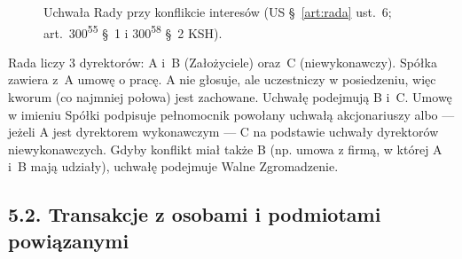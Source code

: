 \documentclass[11pt,a4paper]{report}
\newcommand{\US}[1]{US §~#1}
\begin{document}
\begin{figure}[H]
\centering
{}
\caption{Uchwała Rady przy konflikcie interesów (\US{\ref{art:rada} ust.~6}; art.~300\textsuperscript{55} §~1 i 300\textsuperscript{58} §~2 KSH).}
\end{figure}

\begin{Przyklad}
Rada liczy 3 dyrektorów: A i~B (Założyciele) oraz~C (niewykonawczy). Spółka zawiera z~A umowę o pracę. A nie głosuje, ale uczestniczy w posiedzeniu, więc kworum (co najmniej połowa) jest zachowane. Uchwałę podejmują B i~C. Umowę w imieniu Spółki podpisuje pełnomocnik powołany uchwałą akcjonariuszy albo --- jeżeli A jest dyrektorem wykonawczym --- C na podstawie uchwały dyrektorów niewykonawczych. Gdyby konflikt miał także B (np. umowa z firmą, w której A i~B mają udziały), uchwałę podejmuje Walne Zgromadzenie.
\end{Przyklad}

\subsection*{5.2. Transakcje z osobami i podmiotami powiązanymi}
\end{document}

